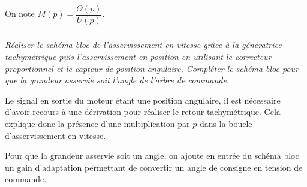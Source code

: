 \documentclass[10pt,fleqn]{article} %
\begin{document}
\begin{multicols}{2}
\begin{corrige}
\begin{center}
\end{center}

\end{corrige}
\else
\fi
On note $M(p)=\dfrac{\Theta(p)}{U(p)}$.

\subparagraph{}
\textit{Réaliser le schéma bloc de l'asservissement en vitesse grâce à la génératrice tachymétrique puis l'asservissement en position en utilisant le correcteur proportionnel et le capteur de position angulaire. Compléter le schéma bloc pour que la grandeur asservie soit l'angle de l'arbre de commande.}
\ifprof
\begin{corrige}
Le signal en sortie du moteur étant une position angulaire, il est nécessaire d'avoir recours à une dérivation pour réaliser le retour tachymétrique. Cela explique donc la présence d'une multiplication par $p$ dans la boucle d'asservissement en vitesse.

Pour que la grandeur asservie soit un angle, on ajoute en entrée du schéma bloc un gain d'adaptation permettant de convertir un angle de consigne en tension de commande.

\footnotesize{
\begin{center}
\end{center}}


\end{corrige}
\end{multicols}
\end{document}
